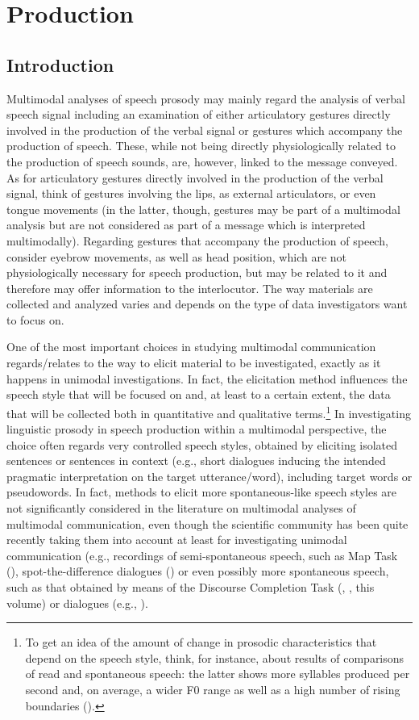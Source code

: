 \documentclass[output=paper]{langsci/langscibook}
\begin{document}
\section{Production} \label{sec:gil:2}
\subsection{Introduction} \label{sec:gil:2:1}
Multimodal analyses of speech prosody may mainly regard the analysis of verbal speech signal including an examination of either articulatory gestures directly involved in the production of the verbal signal or gestures which accompany the production of speech. These, while  not being directly physiologically related to the production of speech sounds, are, however, linked to the message conveyed. As for articulatory gestures directly involved in the production of the verbal signal, think of gestures involving the lips, as external articulators, or even tongue movements (in the latter, though, gestures may be part of a multimodal analysis but are not considered as part of a message which is interpreted multimodally). Regarding gestures that accompany the production of speech, consider eyebrow movements, as well as head position, which are not physiologically necessary for speech production, but may be related to it and therefore may offer information to the interlocutor. The way materials are collected and analyzed varies and depends on the type of data investigators want to focus on.

One of the most important choices in studying multimodal communication regards\slash relates to the way to elicit material to be investigated, exactly as it happens in unimodal investigations. In fact, the elicitation method influences the speech style that will be focused on and, at least to a certain extent, the data that will be collected both in quantitative and qualitative terms.\footnote{To get an idea of the amount of change in prosodic characteristics that depend on the speech style, think, for instance, about results of comparisons of read and spontaneous speech: the latter shows more syllables produced per second and, on average, a wider F0 range \citep{Blaauw1995} as well as a high number of rising boundaries (\citealt{Ayers1994,Blaauw1995}).} In investigating linguistic prosody in speech production within a multimodal perspective, the choice often regards very controlled speech styles, obtained by eliciting isolated sentences or sentences in context (e.g., short dialogues inducing the intended pragmatic interpretation on the target utterance\slash word), including target words or pseudowords. In fact, methods to elicit more spontaneous-like speech styles are not significantly considered in the literature on multimodal analyses of multimodal communication, even though the scientific community has been quite recently taking them into account at least for investigating unimodal communication (e.g.,  recordings of semi-spontaneous speech, such as Map Task (\citealt{Brown1983,Anderson1991}), spot-the-difference dialogues (\citealt{Savy2009,Pean.1993}) or even possibly more spontaneous speech, such as that obtained by means of the Discourse Completion Task (\citealt{BlumKulka1989}, \citeauthor{Vanrell.2018}, this volume) or dialogues (e.g., \citealt{Geng2013}). 
\end{document}
